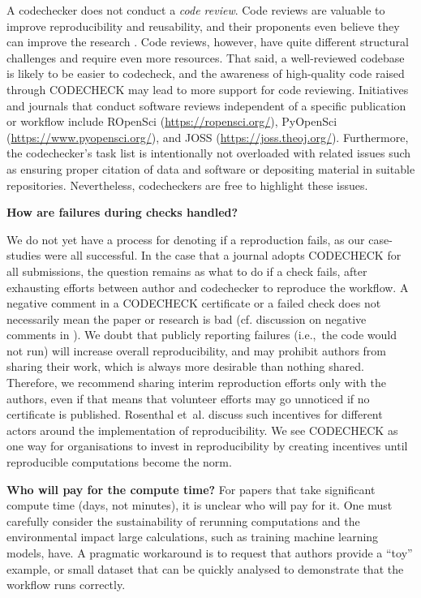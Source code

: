 \documentclass[12pt]{article}
\begin{document}
A codechecker does not conduct a \emph{code review}. Code reviews are
valuable to improve reproducibility and reusability, and their
proponents even believe they can improve the research
\cite{petre_code_2014}.  Code reviews, however, have quite different
structural challenges and require even more resources. That said, a
well-reviewed codebase is likely to be easier to codecheck, and the
awareness of high-quality code raised through CODECHECK may lead to
more support for code reviewing.  Initiatives and journals that
conduct software reviews independent of a specific publication or
workflow include ROpenSci (\url{https://ropensci.org/}), PyOpenSci
(\url{https://www.pyopensci.org/}), and JOSS
(\url{https://joss.theoj.org/}).  Furthermore, the codechecker's task
list is intentionally not overloaded with related issues such as
ensuring proper citation of data and software or depositing material
in suitable repositories. Nevertheless, codecheckers are free to
highlight these issues.

\textbf{How are failures during checks handled?}

We do not yet have a process for denoting if a reproduction fails, as
our case-studies were all successful.  In the case that a journal
adopts CODECHECK for all submissions, the question remains as what to
do if a check fails, after exhausting efforts between author and
codechecker to reproduce the workflow.  A negative comment in a
CODECHECK certificate or a failed check does not necessarily mean the
paper or research is bad (cf. discussion on negative comments in
\cite{everythinghertz123}).  We doubt that publicly reporting failures
(i.e.,~the code would not run) will increase overall reproducibility,
and may prohibit authors from sharing their work, which is always more
desirable than nothing shared. Therefore, we recommend sharing interim
reproduction efforts only with the authors, even if that means that volunteer
efforts may go unnoticed if no certificate is published.  
Rosenthal et~al. \cite{Rosenthal2016b} discuss such incentives for
different actors around the implementation of reproducibility. We see
CODECHECK as one way for organisations to invest in reproducibility by
creating incentives until reproducible computations become the norm.

\textbf{Who will pay for the compute time?}  For papers that take
significant compute time (days, not minutes), it is unclear who will
pay for it. One must carefully consider the sustainability of
rerunning computations and the environmental impact large
calculations, such as training machine learning models, have.  A
pragmatic workaround is to request that authors provide a ``toy''
example, or small dataset that can be quickly analysed to demonstrate
that the workflow runs correctly.
\end{document}
